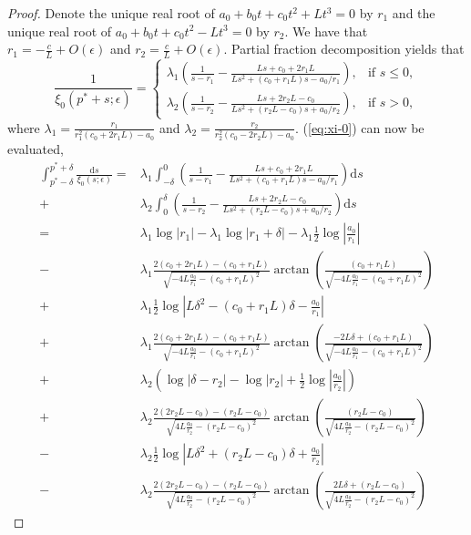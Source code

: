 \documentclass[10pt,a4paper]{amsart}
\begin{document}
\begin{proof}
    Denote the unique real root of $a_0+b_0t+c_0t^2+Lt^3=0$ by $r_1$ and the unique real root of $a_0+b_0t+c_0t^2-Lt^3=0$ by $r_2$. We have that $r_1=-\frac{c}{L}+O(\epsilon)$ and $r_2=\frac{c}{L}+O(\epsilon)$.   
    Partial fraction decomposition yields that
    $$
    \frac{1}{\xi_0(p^*+s;\epsilon)}=\begin{cases}
        \lambda_1\left(\frac{1}{s-r_1}-\frac{Ls+c_0+2r_1L}{Ls^{2}+\left(c_0+r_1L\right)s-a_0/r_1}\right),&\text{if } s\le 0,\\
        \lambda_2\left(\frac{1}{s-r_{2}}-\frac{Ls+2r_{2}L-c_0}{Ls^{2}+\left(r_{2}L-c_0\right)s+a_0/r_{2}}\right),&\text{if } s> 0,
    \end{cases}
    $$
    where $\lambda_1=\frac{r_1}{r_1^{2}\left(c_0+2r_1L\right)-a_0}$ and $\lambda_2=\frac{r_{2}}{r_{2}^{2}\left(c_0-2r_{2}L\right)-a_0}$. (\ref{eq:xi-0}) can now be evaluated,
    \begin{align*}
        \int_{p^*-\delta}^{p^*+\delta}\frac{\mathrm{d}s}{\xi_0(s;\epsilon)}=&\lambda_1\int_{-\delta}^0\left(\frac{1}{s-r_1}-\frac{Ls+c_0+2r_1L}{Ls^{2}+\left(c_0+r_1L\right)s-a_0/r_1}\right)\mathrm{d}s\\
        +&\lambda_2\int_0^{\delta}\left(\frac{1}{s-r_{2}}-\frac{Ls+2r_{2}L-c_0}{Ls^{2}+\left(r_{2}L-c_0\right)s+a_0/r_{2}}\right)\mathrm{d}s\\
        =&\lambda_1\log\left|r_{1}\right|-\lambda_1\log\left|r_{1}+\delta\right|-\lambda_1\frac{1}{2}\log\left|\frac{a_{0}}{r_{1}}\right|\\-&\lambda_1\frac{2(c_{0}+2r_{1}L)-\left(c_{0}+r_{1}L\right)}{\sqrt{-4L\frac{a_{0}}{r_{1}}-\left(c_{0}+r_{1}L\right)^{2}}}\arctan\left(\frac{\left(c_{0}+r_{1}L\right)}{\sqrt{-4L\frac{a_{0}}{r_{1}}-\left(c_{0}+r_{1}L\right)^{2}}}\right)\\+&\lambda_1\frac{1}{2}\log\left|L\delta^{2}-\left(c_{0}+r_{1}L\right)\delta-\frac{a_{0}}{r_{1}}\right|\\+&\lambda_1\frac{2(c_{0}+2r_{1}L)-\left(c_{0}+r_{1}L\right)}{\sqrt{-4L\frac{a_{0}}{r_{1}}-\left(c_{0}+r_{1}L\right)^{2}}}\arctan\left(\frac{-2L\delta+\left(c_{0}+r_{1}L\right)}{\sqrt{-4L\frac{a_{0}}{r_{1}}-\left(c_{0}+r_{1}L\right)^{2}}}\right)\\
        +&\lambda_2\left(\log\left|\delta-r_{2}\right|-\log\left|r_{2}\right|+\frac{1}{2}\log\left|\frac{a_{0}}{r_{2}}\right|\right)\\+&\lambda_2\frac{2\left(2r_{2}L-c_{0}\right)-\left(r_{2}L-c_{0}\right)}{\sqrt{4L\frac{a_{0}}{r_{2}}-\left(r_{2}L-c_{0}\right)^{2}}}\arctan\left(\frac{\left(r_{2}L-c_{0}\right)}{\sqrt{4L\frac{a_{0}}{r_{2}}-\left(r_{2}L-c_{0}\right)^{2}}}\right)\\-&\lambda_2\frac{1}{2}\log\left|L\delta^{2}+\left(r_{2}L-c_{0}\right)\delta+\frac{a_{0}}{r_{2}}\right|\\-&\lambda_2\frac{2\left(2r_{2}L-c_{0}\right)-\left(r_{2}L-c_{0}\right)}{\sqrt{4L\frac{a_{0}}{r_{2}}-\left(r_{2}L-c_{0}\right)^{2}}}\arctan\left(\frac{2L\delta+\left(r_{2}L-c_{0}\right)}{\sqrt{4L\frac{a_{0}}{r_{2}}-\left(r_{2}L-c_{0}\right)^{2}}}\right)

\end{align*}
\end{proof}
\end{document}
